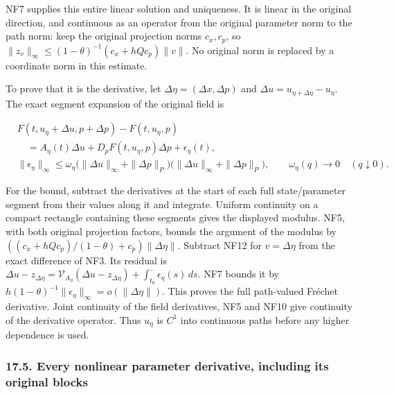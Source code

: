 \documentclass[
  11pt,
]{article}
\begin{document}
NF7 supplies this entire linear solution and uniqueness. It is linear in
the original direction, and continuous as an operator from the original
parameter norm to the path norm: keep the original projection norms
\(c_x,c_p\), so \(\|z_v\|_\infty\leq(1-\theta)^{-1}(c_x+hQc_p)\|v\|\).
No original norm is replaced by a coordinate norm in this estimate.

To prove that it is the derivative, let
\(\Delta\eta=(\Delta x,\Delta p)\) and
\(\Delta u=u_{\eta+\Delta\eta}-u_\eta\). The exact segment expansion of
the original field is

\[
 \begin{aligned}
 &F(t,u_\eta+\Delta u,p+\Delta p)-F(t,u_\eta,p)\\
 &\quad=A_\eta(t)\Delta u+
               D_pF(t,u_\eta,p)\Delta p+\epsilon_\eta(t),\\
 &\|\epsilon_\eta\|_\infty
   \leq\omega_\eta\bigl(\|\Delta u\|_\infty+\|\Delta p\|_P\bigr)
             \bigl(\|\Delta u\|_\infty+\|\Delta p\|_P\bigr),
       \qquad \omega_\eta(q)\longrightarrow0\quad(q\downarrow0).
 \end{aligned}
 \tag{NF13}
\]

For the bound, subtract the derivatives at the start of each full
state/parameter segment from their values along it and integrate.
Uniform continuity on a compact rectangle containing these segments
gives the displayed modulus. NF5, with both original projection factors,
bounds the argument of the modulus by
\(((c_x+hQc_p)/(1-\theta)+c_p)\|\Delta\eta\|\). Subtract NF12 for
\(v=\Delta\eta\) from the exact difference of NF3. Its residual is
\(\Delta u-z_{\Delta\eta}=\mathcal V_{A_\eta}(\Delta u-z_{\Delta\eta})
+\int_{t_0}^{\,\cdot\,}\epsilon_\eta(s)\,ds\). NF7 bounds it by
\(h(1-\theta)^{-1}\|\epsilon_\eta\|_\infty=o(\|\Delta\eta\|)\). This
proves the full path-valued Fréchet derivative. Joint continuity of the
field derivatives, NF5 and NF10 give continuity of the derivative
operator. Thus \(u_\eta\) is \(C^1\) into continuous paths before any
higher dependence is used.

\subsubsection{17.5. Every nonlinear parameter derivative, including its
original
blocks}\label{every-nonlinear-parameter-derivative-including-its-original-blocks}
\end{document}
